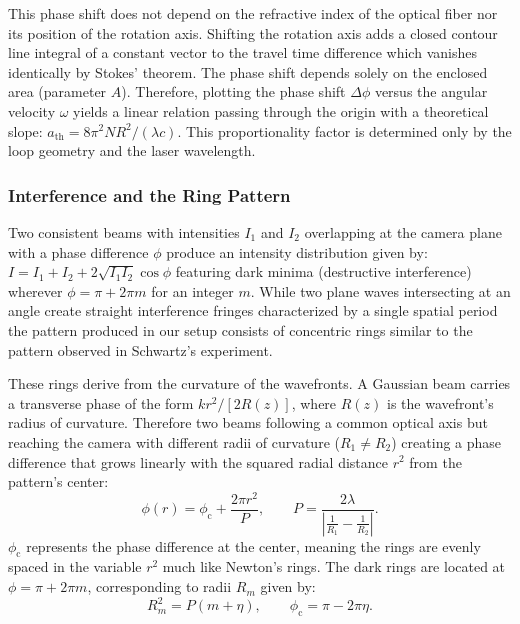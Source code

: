 This phase shift does not depend on the refractive index of the optical fiber nor its position of the rotation axis. Shifting the rotation axis adds a closed contour line integral of a constant vector to the travel time difference which vanishes identically by Stokes' theorem. The phase shift depends solely on the enclosed area (parameter $A$). Therefore, plotting the phase shift $\Delta\phi$ versus the angular velocity $\omega$ yields a linear relation passing through the origin with a theoretical slope: $a_\mathrm{th} = 8\pi^2 N R^2/(\lambda c)$. This proportionality factor is determined only by the loop geometry and the laser wavelength.

\subsubsection{Interference and the Ring Pattern}
\label{sec:rings}

Two consistent beams with intensities $I_1$ and $I_2$ overlapping at the camera plane with a phase difference $\phi$ produce an intensity distribution given by: $I = I_1 + I_2 + 2\sqrt{I_1 I_2}\cos\phi$ featuring dark minima (destructive interference) wherever $\phi = \pi + 2\pi m$ for an integer $m$. While two plane waves intersecting at an angle create straight interference fringes characterized by a single spatial period the pattern produced in our setup consists of concentric rings similar to the pattern observed in Schwartz's experiment.

These rings derive from the curvature of the wavefronts. A Gaussian beam carries a transverse phase of the form $kr^2/[2R(z)]$, where $R(z)$ is the wavefront's radius of curvature. Therefore two beams following a common optical axis but reaching the camera with different radii of curvature ($R_1 \neq R_2$) creating a phase difference that grows linearly with the squared radial distance $r^2$ from the pattern's center:
\begin{equation}
  \phi(r) = \phi_\mathrm{c} + \frac{2\pi r^2}{P}, \qquad
  P = \frac{2\lambda}{\left| \frac{1}{R_1} - \frac{1}{R_2} \right|}.
  \label{eq:rings}
\end{equation}
$\phi_\mathrm{c}$ represents the phase difference at the center, meaning the rings are evenly spaced in the variable $r^2$ much like Newton's rings.
The dark rings are located at $\phi = \pi + 2\pi m$, corresponding to radii $R_m$ given by:
\begin{equation}
  R_m^2 = P(m + \eta), \qquad \phi_\mathrm{c} = \pi - 2\pi\eta.
  \label{eq:dark_rings}
\end{equation}

